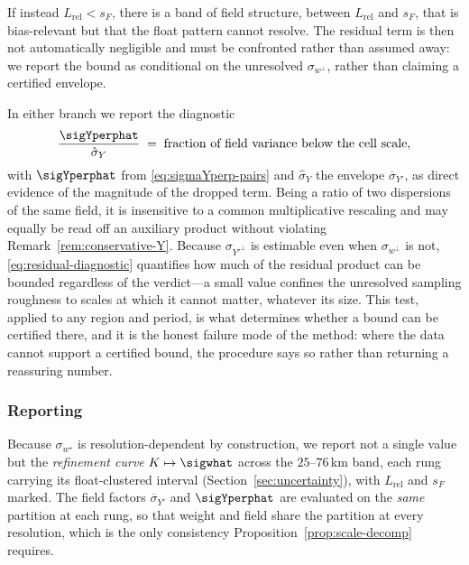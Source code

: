 If instead $L_{\mathrm{rel}}<s_F$, there is a band of field structure,
between $L_{\mathrm{rel}}$ and $s_F$, that is bias-relevant but that the
float pattern cannot resolve. The residual term is then not automatically
negligible and must be confronted rather than assumed away: we report the
bound as conditional on the unresolved $\sigma_{w^{\perp}}$, rather than
claiming a certified envelope.

In either branch we report the diagnostic
\begin{equation}
  \frac{\sigYperphat}{\hat\sigma_Y}
  \;=\;\text{fraction of field variance below the cell scale},
  \label{eq:residual-diagnostic}
\end{equation}
with $\sigYperphat$ from \eqref{eq:sigmaYperp-pairs} and $\hat\sigma_Y$
the envelope $\overline{\sigma}_{Y'}$, as direct evidence of the
magnitude of the dropped term. Being a ratio of two dispersions of the
same field, it is insensitive to a common multiplicative rescaling and
may equally be read off an auxiliary product without violating
Remark~\ref{rem:conservative-Y}. Because $\sigma_{Y'^{\perp}}$ is
estimable even when $\sigma_{w^{\perp}}$ is
not, \eqref{eq:residual-diagnostic} quantifies how much of the residual
product can be bounded regardless of the verdict---a small value confines
the unresolved sampling roughness to scales at which it cannot matter,
whatever its size. This test, applied to any region and period, is what
determines whether a bound can be certified there, and it is the honest
failure mode of the method: where the data cannot support a certified
bound, the procedure says so rather than returning a reassuring number.

\subsubsection*{Reporting}

Because $\sigma_{w^{\star}}$ is resolution-dependent by construction, we
report not a single value but the \emph{refinement curve}
$K\mapsto\sigwhat$ across the $25$--$76$\,km band, each rung carrying its
float-clustered interval (Section~\ref{sec:uncertainty}), with
$L_{\mathrm{rel}}$ and $s_F$ marked. The field factors
$\overline{\sigma}_{Y'}$ and $\sigYperphat$ are evaluated on the
\emph{same} partition at each rung, so that weight and field share the
partition at every resolution, which is the only consistency
Proposition~\ref{prop:scale-decomp} requires.

